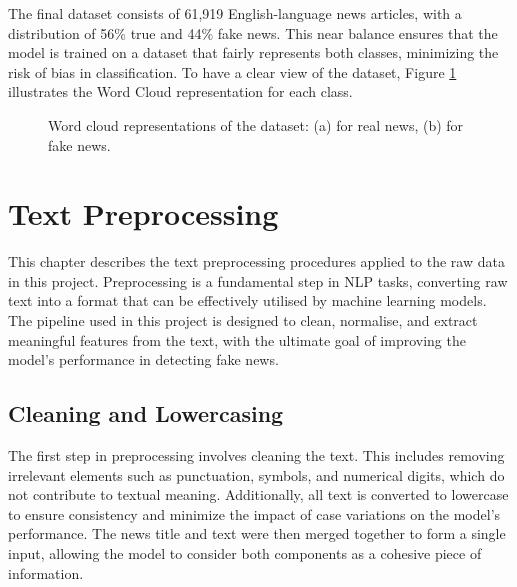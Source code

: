 \documentclass[sn-mathphys-ay, Numbered]{sn-jnl}
\theoremstyle{thmstyleone}%
\theoremstyle{thmstyletwo}%
\theoremstyle{thmstylethree}%
\begin{document}
The final dataset consists of 61,919 English-language news articles, with a distribution of 56\% true and 44\% fake news. This near balance ensures that the model is trained on a dataset that fairly represents both classes, minimizing the risk of bias in classification. To have a clear view of the dataset, Figure \ref{fig:wordclouds} illustrates the Word Cloud representation for each class.
\begin{figure}[t]
	\caption{Word cloud representations of the dataset: (a) for real news, (b) for fake news.}
	\label{fig:wordclouds}
\end{figure}

\section{Text Preprocessing}
This chapter describes the text preprocessing procedures applied to the raw data in this project. Preprocessing is a fundamental step in NLP tasks, converting raw text into a format that can be effectively utilised by machine learning models. The pipeline used in this project is designed to clean, normalise, and extract meaningful features from the text, with the ultimate goal of improving the model's performance in detecting fake news.

\subsection{Cleaning and Lowercasing}
The first step in preprocessing involves cleaning the text. This includes removing irrelevant elements such as punctuation, symbols, and numerical digits, which do not contribute to textual meaning. Additionally, all text is converted to lowercase to ensure consistency and minimize the impact of case variations on the model's performance. The news title and text were then merged together to form a single input, allowing the model to consider both components as a cohesive piece of information.
\end{document}

